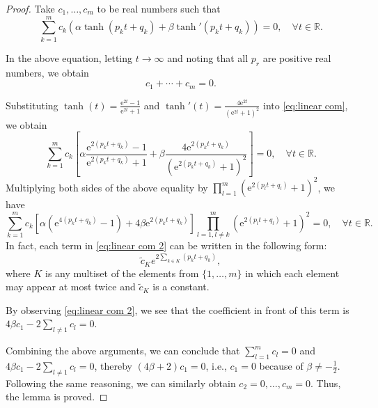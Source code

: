 \documentclass{article}
\begin{document}
\begin{proof}
Take $c_1,\ldots,c_m$ to be real numbers such that 
\begin{equation}
\sum_{k=1}^{m}c_k \left( \alpha \tanh(p_k t + q_k)+\beta \tanh'(p_k t + q_k)\right)  = 0, \quad \forall t \in \mathbb{R}. \label{eq:linear com}
\end{equation}

In the above equation, letting \( t \to \infty \) and noting that all \( p_r \) are positive real numbers, we obtain 
\begin{equation}
c_1 + \cdots + c_m = 0 .
\end{equation}

Substituting $\tanh(t)=\frac{\mathrm{e}^{2t}-1}{\mathrm{e}^{2t}+1}$  and $\tanh'(t)=\frac{4\mathrm{e}^{2t}}{(\mathrm{e}^{2t}+1)^2}$ into  \cref{eq:linear com}, we obtain 
\begin{equation*}
    \sum_{k=1}^{m} c_k \left[\alpha \frac{\mathrm{e}^{2(p_k t + q_k)} - 1}{\mathrm{e}^{2(p_k t + q_k)} + 1}+\beta \frac{4\mathrm{e}^{2(p_k t + q_k)}}{(\mathrm{e}^{2(p_k t + q_k)}+1)^2}\right]  = 0, \quad \forall t \in \mathbb{R}.
\end{equation*}
Multiplying both sides of the above equality by $\prod_{l=1}^{m}(\mathrm{e}^{2(p_l t + q_l)} + 1)^2$, we have
\begin{equation}
    \sum_{k=1}^{m} c_k \left[\alpha\left( \mathrm{e}^{4(p_k t + q_k)} - 1\right)+4\beta\mathrm{e}^{2(p_k t + q_k)}\right]  \prod_{l=1, l \neq k}^{m} (\mathrm{e}^{2(p_l t + q_l)} + 1)^2 = 0, \quad \forall t \in \mathbb{R}.\label{eq:linear com 2}
\end{equation}
In fact, each term in \cref{eq:linear com 2} can be written in the following form:
\begin{equation*}
    \tilde{c}_{K}e^{2\sum_{k\in K}(p_k t+q_k)} ,
\end{equation*}
where $K$ is any multiset of the elements from $\{1,\ldots,m\}$ in which each element may appear at most twice and $\tilde{c}_{K}$ is a constant.

By observing \cref{eq:linear com 2}, we see that the coefficient in front of this term is $4\beta c_{1}-2\sum_{l\neq 1}c_{l}=0$.

Combining the above arguments, we can conclude that $\sum_{l=1}^{m}c_{l}=0$ and $4\beta c_{1}-2\sum_{l\neq 1}c_{l}=0$, thereby $(4\beta+2)c_{1}=0$, i.e., $c_1=0$ because of $\beta\neq -\frac{1}{2}$. 
Following the same reasoning, we can similarly obtain \( c_2 = 0, \ldots, c_m = 0 \). Thus, the lemma is proved.

\end{proof}
\end{document}
